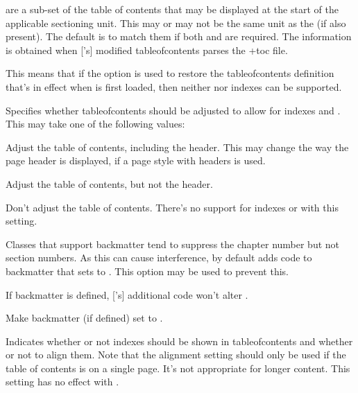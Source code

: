 \documentclass[fontsize=12pt]{scrbook}
\begin{document}
 are a sub-set of the table of contents that may be
displayed at the start of the applicable sectioning unit. This may
or may not be the same unit as the  (if also
present). The default is to match them if both  and
 are required. The  information is
obtained when ['s] modified \gls{tableofcontents}
parses the \ext+{toc} file.

This means that if the  option is used to 
restore the \gls{tableofcontents} definition that's in
effect when  is first loaded, then neither
 nor  indexes can be supported.


Specifies whether \gls{tableofcontents} should be adjusted to allow
for  indexes and .
This may take one of the following values:


Adjust the table of contents, including the header. This may change
the way the page header is displayed, if a page style with headers
is used.


Adjust the table of contents, but not the header.


Don't adjust the table of contents. There's no support for
 indexes or  with this setting.


Classes that support \gls{backmatter} tend to suppress the
chapter number but not section numbers. As this can cause
interference,  by default adds code to \gls{backmatter}
that sets  to . This option may be used to
prevent this.


If \gls{backmatter} is defined, ['s] additional code
won't alter .


Make \gls{backmatter} (if defined) set  to .


Indicates whether or not  indexes should be shown in
\gls{tableofcontents} and whether or not to align them. Note that
the alignment setting should only be used if the table of contents
is on a single page. It's not appropriate for longer content.
This setting has no effect with .
\end{document}
